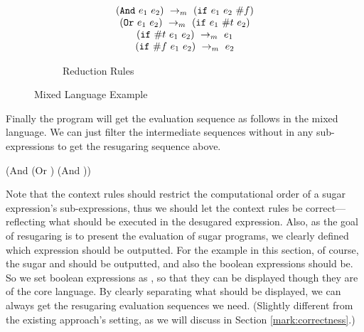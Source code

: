 \begin{figure}[thb]
\begin{subfigure}{\linewidth}{\footnotesize
    \begin{flushleft}
        \[
        \begin{array}{c}
        (\mbox{\tt And}~e_1~e_2) ~\rightarrow_m~(\mbox{\tt if}~e_1~e_2~\#f)\\
        (\mbox{\tt Or}~e_1~e_2) ~\rightarrow_m~(\mbox{\tt if}~e_1~\#t~e_2)\\
        (\mbox{\tt if}~\#t~e_1~e_2) ~\rightarrow_m~e_1\\
        (\mbox{\tt if}~\#f~e_1~e_2) ~\rightarrow_m~e_2 
        \end{array}
        \]
    \end{flushleft}
    \caption{Reduction Rules}
    \label{fig:mixreduction}
}
\end{subfigure}

\caption{Mixed Language Example}
\label{fig:mixexample}
\end{figure}

Finally the program  will get the evaluation sequence as follows in the mixed language. We can just filter the intermediate sequences without  in any sub-expressions to get the resugaring sequence above.

{\footnotesize
\begin{Codes}
    (And (Or \true \false) (And \false \true))
\OneStep{ \false}
\end{Codes}
}
Note that the context rules should restrict the computational order of a sugar expression's sub-expressions, thus we should let the context rules be correct---reflecting what should be executed in the desugared expression. Also, as the goal of resugaring is to present the evaluation of sugar programs, we clearly defined which expression should be outputted. For the example in this section, of course, the sugar  and  should be outputted, and also the boolean expressions should be. So we set boolean expressions as , so that they can be displayed though they are of the core language. By clearly separating what should be displayed, we can always get the resugaring evaluation sequences we need. (Slightly different from the existing approach's setting, as we will discuss in Section \ref{mark:correctness}.)